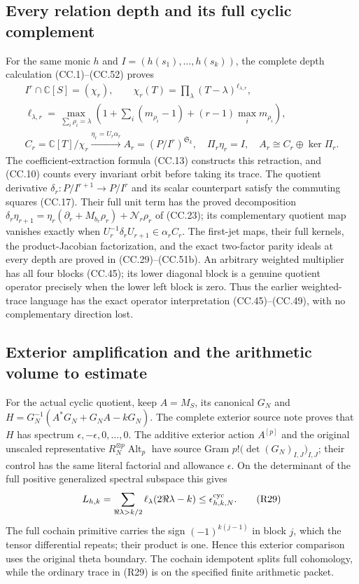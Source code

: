 \subsection{Every relation depth and its full cyclic complement}

For the same monic $h$ and $I=(h(s_1),\ldots,h(s_k))$, the complete
depth calculation (CC.1)--(CC.52) proves
\[
 \begin{gathered}
 I^r\cap\mathbb C[S]=(\chi_r),\qquad
 \chi_r(T)=\prod_\lambda(T-\lambda)^{\ell_{\lambda,r}},\\
 \ell_{\lambda,r}=\max_{\sum_i\rho_i=\lambda}
 \left(1+\sum_i(m_{\rho_i}-1)+(r-1)\max_i m_{\rho_i}\right),\\
 C_r=\mathbb C[T]/\chi_r\xrightarrow{\eta_r=U_r\alpha_r}
 A_r=(P/I^r)^{\mathfrak S_k},\quad
 \Pi_r\eta_r=I,\quad A_r\cong C_r\oplus\ker\Pi_r.
\end{gathered}
 \tag{R28}
\]
The coefficient-extraction formula (CC.13) constructs this retraction,
and (CC.10) counts every invariant orbit before taking its trace.
The quotient derivative $\delta_r:P/I^{r+1}\to P/I^r$ and its scalar
counterpart satisfy the commuting squares (CC.17). Their full unit
term has the proved decomposition
$\delta_r\eta_{r+1}=\eta_r(\partial_r+M_{b_r}\rho_r)
+\mathcal N_r\rho_r$ of (CC.23); its complementary quotient map
vanishes exactly when $U_r^{-1}\delta_rU_{r+1}\in\alpha_rC_r$.
The first-jet maps, their full kernels, the product-Jacobian
factorization, and the exact two-factor parity ideals at every depth
are proved in (CC.29)--(CC.51b). An arbitrary weighted multiplier
has all four blocks (CC.45); its lower diagonal block is a genuine
quotient operator precisely when the lower left block is zero.
Thus the earlier weighted-trace language has the exact operator
interpretation (CC.45)--(CC.49), with no complementary direction lost.

\subsection{Exterior amplification and the arithmetic volume to estimate}

For the actual cyclic quotient, keep $A=M_S$, its canonical $G_N$ and
$H=G_N^{-1}(A^*G_N+G_NA-kG_N)$. The complete exterior source note
proves that $H$ has spectrum $\epsilon,-\epsilon,0,\ldots,0$.
The additive exterior action $A^{[p]}$ and the original unscaled
representative $R_N^{\otimes p}\operatorname{Alt}_p$ have source Gram
$p!\bigl(\det(G_N)_{I,J}\bigr)_{I,J}$; their control has the same
literal factorial and allowance $\epsilon$. On the determinant of
the full positive generalized spectral subspace this gives
\[
 L_{h,k}=\sum_{\Re\lambda>k/2}\ell_\lambda(2\Re\lambda-k)
 \le\epsilon_{h,k,N}^{\rm cyc}.
 \tag{R29}
\]
The full cochain primitive carries the sign $(-1)^{k(j-1)}$ in
block $j$, which the tensor differential repeats; their product is
one. Hence this exterior comparison uses the original theta boundary.
The cochain idempotent splits full cohomology, while the ordinary
trace in (R29) is on the specified finite arithmetic packet.

